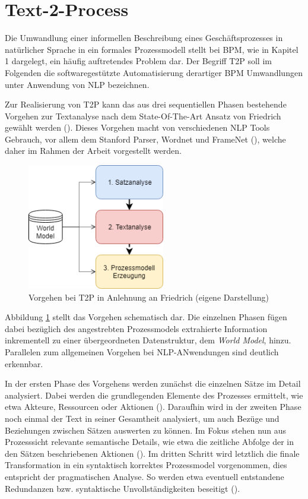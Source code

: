\section{Text-2-Process}


Die Umwandlung einer informellen Beschreibung eines Geschäftsprozesses in na\-tür\-li\-cher Sprache in ein formales Prozessmodell stellt bei \ac{BPM}, wie in Kapitel 1 dargelegt, ein häufig auftretendes Problem dar. 
Der Begriff \ac{T2P} soll im Folgenden die softwaregestützte Automatisierung derartiger \ac{BPM} Umwandlungen unter Anwendung von \ac{NLP} bezeichnen.\par
Zur Realisierung von \ac{T2P} kann das aus drei sequentiellen Phasen bestehende Vorgehen zur Textanalyse nach dem State-Of-The-Art Ansatz von Friedrich gewählt werden (\cite[vgl.][4 ff.]{FRIEDRICH2}). Dieses Vorgehen macht von verschiedenen \ac{NLP} Tools Gebrauch, vor allem dem Stanford Parser, Wordnet und FrameNet (\cite[vgl.][11]{RIEFER}), welche daher im Rahmen der Arbeit vorgestellt werden.
\begin{figure}
\includegraphics[width=6cm]{pictures/T2P_highlevel.png}
\caption{Vorgehen bei T2P in Anlehnung an Friedrich (eigene Darstellung)}
\label{fig:T2PHL}
\end{figure}
Abbildung \ref{fig:T2PHL} stellt das Vorgehen schematisch dar. Die einzelnen Phasen fügen dabei bezüglich des angestrebten Prozessmodels extrahierte Information inkrementell zu einer übergeordneten Datenstruktur, dem \textit{World Model}, hinzu. Parallelen zum allgemeinen Vorgehen bei NLP-ANwendungen sind deutlich erkennbar.\par
In der ersten Phase des Vorgehens werden zunächst die einzelnen Sätze im Detail analysiert. Dabei werden die grundlegenden Elemente des Prozesses ermittelt, wie etwa Akteure, Ressourcen oder Aktionen (\cite[vgl.][47 ff.]{FRIEDRICH1}). Daraufhin wird in der zweiten Phase noch einmal der Text in seiner Gesamtheit analysiert, um auch Bezüge und Beziehungen zwischen Sätzen auswerten zu können. Im Fokus stehen nun aus Prozesssicht relevante semantische Details, wie etwa die zeitliche Abfolge der in den Sätzen beschriebenen Aktionen (\cite[vgl.][66 ff.]{FRIEDRICH1}). Im dritten Schritt wird letztlich die finale Transformation in ein syntaktisch korrektes Prozessmodel vorgenommen, dies entspricht der pragmatischen Analyse. So werden etwa  eventuell entstandene Redundanzen bzw. syntaktische Unvollständigkeiten beseitigt (\cite[vgl.][90 ff.]{FRIEDRICH1}).
